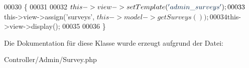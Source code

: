 \begin{DoxyCode}
00030                                        \{
00031                 
00032                 $this->view->setTemplate(\textcolor{stringliteral}{'admin\_surveys'});
00033                 $this->view->assign(\textcolor{stringliteral}{'surveys'}, $this->model->getSurveys());
00034                 $this->view->display();
00035                 
00036         \}       
\end{DoxyCode}


Die Dokumentation für diese Klasse wurde erzeugt aufgrund der Datei\-:\begin{DoxyCompactItemize}
\item 
Controller/\-Admin/\-Survey.\-php\end{DoxyCompactItemize}
